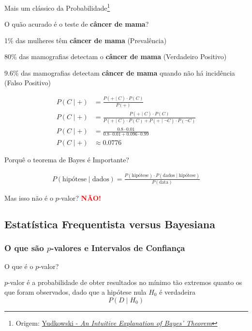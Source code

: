 \begin{frame}{Mais um clássico da Probabilidade\footnote{Origem: \href{https://www.yudkowsky.net/rational/bayes}{Yudkowski - \textit{An Intuitive Explanation of Bayes’ Theorem}}}}
	\begin{exemplo}
		\small
		O quão acurado é o teste de \textbf{câncer de mama}?
		\begin{vfilleditems}
			\item \footnotesize 1\% das mulheres têm \textbf{câncer de mama} (Prevalência)
			\item \footnotesize 80\% das mamografias detectam o \textbf{câncer de mama} (Verdadeiro Positivo)
			\item \footnotesize 9.6\% das mamografias detectam \textbf{câncer de mama} quando não há incidência (Falso Positivo)
		\end{vfilleditems}
		$$
			\begin{aligned}
				P(C \mid +) & = \frac{P(+ \mid C) \cdot P(C)}{P(+)}                                                      \\
				P(C \mid +) & = \frac{P(+ \mid C) \cdot P(C)}{P(+ \mid C) \cdot P(C) + P(+ \mid \neg C) \cdot P(\neg C)} \\
				P(C \mid +) & = \frac{0.8 \cdot 0.01}{0.8 \cdot 0.01 + 0.096 \cdot 0.99}                                 \\
				P(C \mid +) & \approx 0.0776
			\end{aligned}
		$$
	\end{exemplo}
\end{frame}


\begin{frame}{Porquê o teorema de Bayes é Importante?}
	\begin{idea}
		$$
			\begin{aligned}
				P(\text{hipótese} \mid \text{dados}) = \frac{P(\text{hipótese}) \cdot P(\text{dados} \mid \text{hipótese})}{P(\text{data})}
			\end{aligned}
		$$
	\end{idea}
	Mas isso não é o $p$-valor? \textcolor{red}{\textbf{NÃO!}}
\end{frame}

\subsection{Estatística Frequentista versus Bayesiana}
\subsubsection{O que são $p$-valores e Intervalos de Confiança}
\begin{frame}{O que é o $p$-valor?}
	\begin{defn}[$p$-valor]
		$p$-valor é a probabilidade de obter resultados no mínimo tão
		extremos quanto os que foram observados, dado que a hipótese nula
		$H_0$ é verdadeira
		$$P(D \mid H_0)$$
	\end{defn}
\end{frame}

